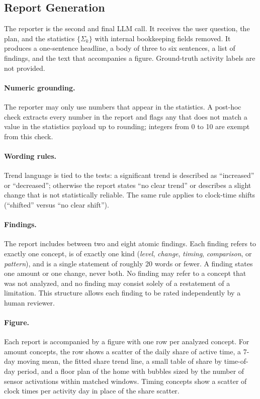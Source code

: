 \subsection{Report Generation}
\label{sec:reporting}

The reporter is the second and final LLM call. It receives the user question, the plan, and the statistics $\{\Sigma_k\}$ with internal bookkeeping fields removed. It produces a one-sentence headline, a body of three to six sentences, a list of findings, and the text that accompanies a figure. Ground-truth activity labels are not provided.

\paragraph{Numeric grounding.}
The reporter may only use numbers that appear in the statistics. A post-hoc check extracts every number in the report and flags any that does not match a value in the statistics payload up to rounding; integers from 0 to 10 are exempt from this check.

\paragraph{Wording rules.}
Trend language is tied to the tests: a significant trend is described as ``increased'' or ``decreased''; otherwise the report states ``no clear trend'' or describes a slight change that is not statistically reliable. The same rule applies to clock-time shifts (``shifted'' versus ``no clear shift'').

\paragraph{Findings.}
The report includes between two and eight atomic findings. Each finding refers to exactly one concept, is of exactly one kind (\emph{level}, \emph{change}, \emph{timing}, \emph{comparison}, or \emph{pattern}), and is a single statement of roughly 20 words or fewer. A finding states one amount or one change, never both. No finding may refer to a concept that was not analyzed, and no finding may consist solely of a restatement of a limitation. This structure allows each finding to be rated independently by a human reviewer.

\paragraph{Figure.}
Each report is accompanied by a figure with one row per analyzed concept. For amount concepts, the row shows a scatter of the daily share of active time, a 7-day moving mean, the fitted share trend line, a small table of share by time-of-day period, and a floor plan of the home with bubbles sized by the number of sensor activations within matched windows. Timing concepts show a scatter of clock times per activity day in place of the share scatter.


